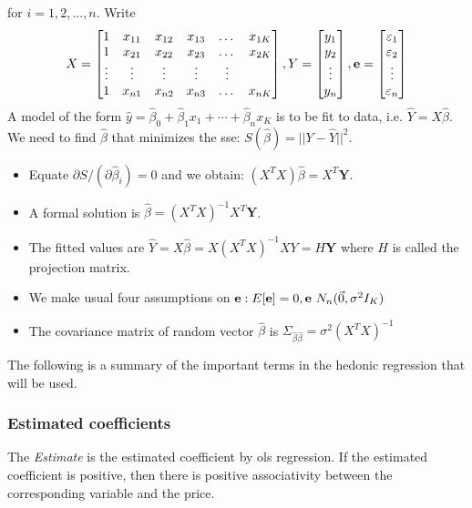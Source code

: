 \documentclass[12pt]{article}
\begin{document}
for $i=1, 2, ..., n$. 
Write 
$$X=\begin{bmatrix}
    1   & x_{11}       & x_{12} & x_{13} & \dots & x_{1K} \\
    1   & x_{21}       & x_{22} & x_{23} & \dots & x_{2K} \\
    \vdots   & \vdots & \vdots &\vdots &\vdots \\
    1 & x_{n1}       & x_{n2} & x_{n3} & \dots & x_{nK}
\end{bmatrix}, Y=\begin{bmatrix}
y_1\\
y_2\\
\vdots\\
y_n
\end{bmatrix}, \textrm{\textbf{e}}=\begin{bmatrix}
\varepsilon_1\\
\varepsilon_2\\
\vdots\\
\varepsilon_n
\end{bmatrix}$$
A model of the form
$\hat y=\hat \beta_0+\hat \beta_1 x_1+\cdots +\hat \beta_n x_K$
is to be fit to data, i.e. $\hat Y=X\hat \beta$. We need to find $\hat \beta $ that minimizes the \acrfull{sse}: $S(\hat \beta)=||Y-\hat Y||^2$.
\begin{itemize}
    \item Equate $\partial S/(\partial \hat \beta_i )=0$ and we obtain: $(X^T X) \hat \beta=X^T \textbf{Y}$.
    \item A formal solution is $\hat \beta=(X^T X)^{-1} X^T \textbf{Y}$. 
    \item The fitted values are $\hat Y=X\hat \beta=X(X^T X)^{-1}XY=H\textbf{Y}$ where $H$ is called the projection matrix.
    
    \item We make usual four assumptions on $\textrm{\textbf{e}}: E[\textbf{\textrm{e}}]=0, \textbf{\textrm{e}}~N_n(\vec 0, \sigma^2 I_K)$
    \item The covariance matrix of random vector $\hat \beta$ is $\Sigma_{\hat \beta \hat \beta}=\sigma^2 (X^T X)^{-1}$
\end{itemize}

The following is a summary of the important terms in the hedonic regression that will be used.
\subsubsection{Estimated coefficients} The \textit{Estimate} is the estimated coefficient by \acrshort{ols} regression. If the estimated coefficient is positive, then there is positive associativity between the corresponding variable and the price.
\end{document}

